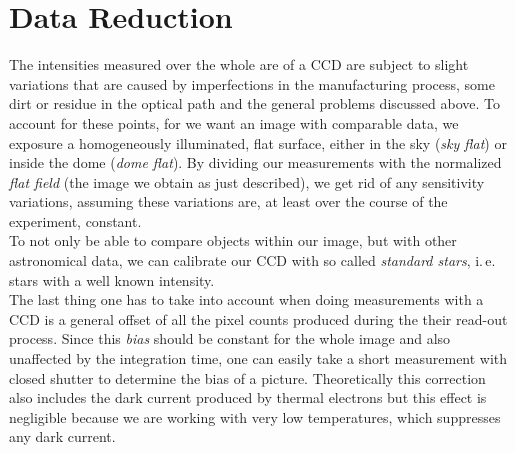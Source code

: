 \section{Data Reduction}

The intensities measured over the whole are of a CCD are subject to slight variations that are caused by imperfections in the manufacturing process, some dirt or residue in the optical path and the general problems discussed above. To account for these points, for we want an image with comparable data, we exposure a homogeneously illuminated, flat surface, either in the sky (\textit{sky flat}) or inside the dome (\textit{dome flat}). By dividing our measurements with the normalized \textit{flat field} (the image we obtain as just described), we get rid of any sensitivity variations, assuming these variations are, at least over the course of the experiment, constant.\\
To not only be able to compare objects within our image, but with other astronomical data, we can calibrate our CCD with so called \textit{standard stars}, i.\,e. stars with a well known intensity. \\
The last thing one has to take into account when doing measurements with a CCD is a general offset of all the pixel counts produced during the their read-out process. Since this \textit{bias} should be constant for the whole image and also unaffected by the integration time, one can easily take a short measurement with closed shutter to determine the bias of a picture. Theoretically this correction also includes the dark current produced by thermal electrons but this effect is negligible because we are working with very low temperatures, which suppresses any dark current.

